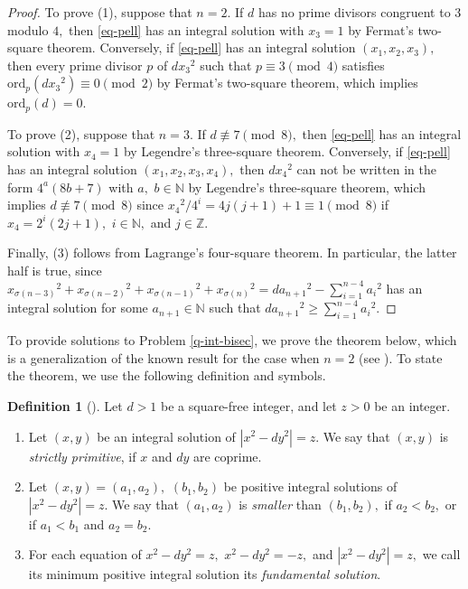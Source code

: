 \documentclass{article}
\theoremstyle{definition}
\newtheorem{df}{Definition}
\theoremstyle{plain}
\newenvironment{pf}{\begin{proof}}{\end{proof}}
\begin{document}
\begin{pf}
To prove (1), suppose that $n = 2.$ 
If $d$ has no prime divisors congruent to $3$ modulo $4,$ then \eqref{eq-pell} has an integral solution with $x_3 = 1$ by Fermat's two-square theorem. 
Conversely, if \eqref{eq-pell} has an integral solution $(x_1,x_2,x_3),$ then every prime divisor $p$ of $dx_3{}^2$ such that $p \equiv 3 \pmod 4$ satisfies $\mathrm{ord}_p(dx_3{}^2) \equiv 0 \pmod 2$ by Fermat's two-square theorem, which implies $\mathrm{ord}_p(d) = 0.$\par
To prove (2), suppose that $n = 3.$ 
If $d \not\equiv 7 \pmod 8,$ then \eqref{eq-pell} has an integral solution with $x_4 = 1$ by Legendre's three-square theorem. 
Conversely, if \eqref{eq-pell} has an integral solution $(x_1,x_2,x_3,x_4),$ then $dx_4{}^2$ can not be written in the form $4^a(8b+7)$ with $a,$ $b \in \mathbb N$ by Legendre's three-square theorem, which implies $d \not\equiv 7 \pmod 8$ since $x_4{}^2/4^i = 4j(j+1)+1 \equiv 1 \pmod 8$ if $x_4 = 2^i(2j+1),$ $i \in \mathbb N,$ and $j \in \mathbb Z.$\par
Finally, (3) follows from Lagrange's four-square theorem. 
In particular, the latter half is true, since $x_{\sigma (n-3)}{}^2+x_{\sigma (n-2)}{}^2+x_{\sigma (n-1)}{}^2+x_{\sigma (n)}{}^2 = da_{n+1}{}^2-\sum_{i = 1}^{n-4}a_i{}^2$ has an integral solution for some $a_{n+1} \in \mathbb N$ such that $da_{n+1}{}^2 \geq \sum_{i = 1}^{n-4}a_i{}^2.$
\end{pf}
To provide solutions to Problem \ref{q-int-bisec}, we prove the theorem below, which is a generalization of the known result for the case when $n = 2$ (see \cite[Theorem 2]{Hir24}). 
To state the theorem, we use the following definition and symbols.
\begin{df}[{\cite[Definition 1]{Hir24}}]
Let $d > 1$ be a square-free integer, and let $z > 0$ be an integer.
\begin{enumerate}
\item[(1)]
Let $(x,y)$ be an integral solution of $|x^2-dy^2| = z.$ 
We say that $(x,y)$ is {\itshape strictly primitive}, if $x$ and $dy$ are coprime.
\item[(2)]
Let $(x,y) = (a_1,a_2),$ $(b_1,b_2)$ be positive integral solutions of $|x^2-dy^2| = z.$ 
We say that $(a_1,a_2)$ is {\it smaller} than $(b_1,b_2),$ if $a_2 < b_2,$ or if $a_1 < b_1$ and $a_2 = b_2.$
\item[(3)]
For each equation of $x^2-dy^2 = z,$ $x^2-dy^2 = -z,$ and $|x^2-dy^2| = z,$ we call its minimum positive integral solution its {\itshape fundamental solution}.
\end{enumerate}
\end{df}
\end{document}
